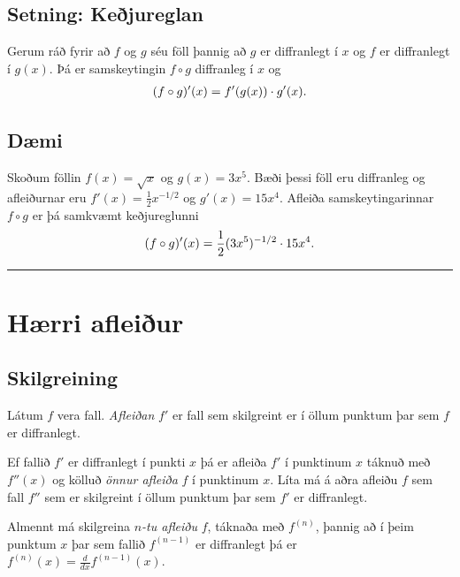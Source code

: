 \documentclass[a4paper,10pt,icelandic]{sphinxmanual}
\begin{document}
\subsection{Setning: Keðjureglan}
\label{kafli03:kedjuregla}\label{kafli03:setning-kejureglan}\label{kafli03:index-4}
Gerum ráð fyrir að \(f\) og \(g\) séu föll þannig að \(g\)
er diffranlegt í \(x\) og \(f\) er diffranlegt í \(g(x)\).
Þá er samskeytingin \(f\circ g\) diffranleg í \(x\) og
\begin{gather}
\begin{split}(f\circ g)'(x) = f'(g(x))\cdot g'(x).\end{split}\notag
\end{gather}

\subsection{Dæmi}
\label{kafli03:id7}
Skoðum föllin \(f(x) = \sqrt x\) og \(g(x) = 3x^5\). Bæði þessi föll eru
diffranleg og afleiðurnar eru \(f'(x) = \frac 12 x^{-1/2}\) og
\(g'(x) = 15x^4\). Afleiða samskeytingarinnar \(f\circ g\) er þá
samkvæmt keðjureglunni
\begin{gather}
\begin{split}(f\circ g)'(x) = \frac 12 (3x^5)^{-1/2} \cdot 15x^4.\end{split}\notag
\end{gather}

\bigskip\hrule{}\bigskip



\section{Hærri afleiður}
\label{kafli03:haerri-afleiur}

\subsection{Skilgreining}
\label{kafli03:skilgreining}
Látum \(f\) vera fall. \emph{Afleiðan} \(f'\) er fall sem skilgreint er
í öllum punktum þar sem \(f\) er diffranlegt.

Ef fallið \(f'\) er diffranlegt í punkti \(x\) þá er afleiða
\(f'\) í punktinum \(x\) táknuð með \(f''(x)\) og kölluð
\textit{önnur afleiða} \(f\) í punktinum \(x\). Líta má á aðra afleiðu
\(f\) sem fall \(f''\) sem er skilgreint í öllum punktum þar sem
\(f'\) er diffranlegt.

Almennt má skilgreina \(n\)\emph{-tu afleiðu} \(f\), táknaða með
\(f^{(n)}\), þannig að í þeim punktum \(x\) þar sem fallið
\(f^{(n-1)}\) er diffranlegt þá er
\(f^{(n)}(x)=\frac{d}{dx}f^{(n-1)}(x)\).
\end{document}
